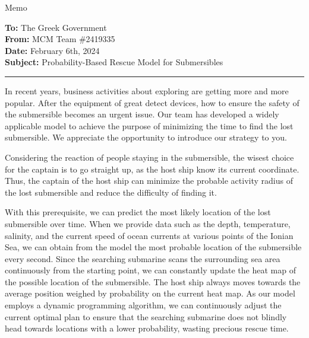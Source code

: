 \documentclass[12pt]{article}
\begin{document}
\begin{letter}{Memo}
\begin{flushleft}  %
\textbf{To:} The Greek Government\\
\textbf{From:} MCM Team \#2419335 \\
\textbf{Date:} February 6th, 2024\\
\textbf{Subject:} Probability-Based Rescue Model for Submersibles
\rule{\linewidth}{2pt}
\end{flushleft}

In recent years, business activities about exploring are getting more and more popular. After the equipment of great detect devices, how to ensure the safety of the submersible becomes an urgent issue. Our team has developed a widely applicable model to achieve the purpose of minimizing the time to find the lost submersible. We appreciate the opportunity to introduce our strategy to you. 

Considering the reaction of people staying in the submersible, the wisest choice for the captain is to go straight up, as the host ship know its current coordinate. Thus, the captain of the host ship can minimize the probable activity radius of the lost submersible and reduce the difficulty of finding it.

With this prerequisite, we can predict the most likely location of the lost submersible over time. When we provide data such as the depth, temperature, salinity, and the current speed of ocean currents at various points of the Ionian Sea, we can obtain from the model the most probable location of the submersible every second. Since the searching submarine scans the surrounding sea area continuously from the starting point, we can constantly update the heat map of the possible location of the submersible. The host ship always moves towards the average position weighed by probability on the current heat map. As our model employs a dynamic programming algorithm, we can continuously adjust the current optimal plan to ensure that the searching submarine does not blindly head towards locations with a lower probability, wasting precious rescue time.


\end{letter}
\end{document}
